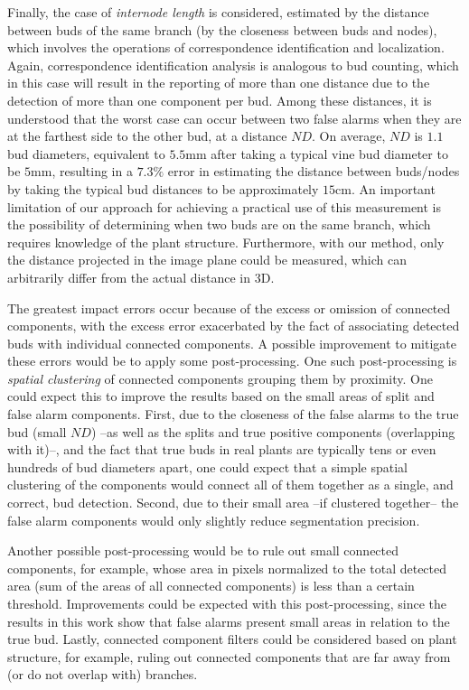 \documentclass[a4paper,authoryear,review]{elsarticle}
\begin{document}
Finally, the case of \emph{internode length} is considered, estimated by the distance between buds of the same branch (by the closeness between buds and nodes), which involves the operations of correspondence identification and localization. Again, correspondence identification analysis is analogous to bud counting, which in this case will result in the reporting of more than one distance due to the detection of more than one component per bud. Among these distances, it is understood that the worst case can occur between two false alarms when they are at the farthest side to the other bud, at a distance $ND$. On average, $ND$ is $1.1$ bud diameters, equivalent to $5.5$mm after taking a typical vine bud diameter to be $5$mm, resulting in a $7.3\%$ error in estimating the distance between buds/nodes by taking the typical bud distances to be approximately $15$cm. 
%
An important limitation of our approach for achieving a practical use of this measurement is the possibility of determining when two buds are on the same branch, which requires knowledge of the plant structure. Furthermore, with our method, only the distance projected in the image plane could be measured, which can arbitrarily differ from the actual distance in 3D. 


The greatest impact errors occur because of the excess or omission of connected components, with the excess error exacerbated by the fact of associating detected buds with individual connected components. A possible improvement to mitigate these errors would be to apply some post-processing. 
%
One such post-processing is \emph{spatial clustering} of connected components grouping them by proximity. One could expect this to improve the results based on the small areas of split and false alarm components. First, due to the closeness of the false alarms to the true bud (small $ND$) --as well as the splits and true positive components (overlapping with it)--, and the fact that true buds in real plants are typically tens or even hundreds of bud diameters apart, one could expect that a simple spatial clustering of the components would connect all of them together as a single, and correct, bud detection. Second, due to their small area --if clustered together-- the false alarm components would only slightly reduce segmentation precision.

Another possible post-processing would be to rule out small connected components, for example, whose area in pixels normalized to the total detected area (sum of the areas of all connected components) is less than a certain threshold. Improvements could be expected with this post-processing, since the results in this work show that false alarms present small areas in relation to the true bud. Lastly, connected component filters could be considered based on plant structure, for example, ruling out connected components that are far away from (or do not overlap with) branches.
\end{document}
